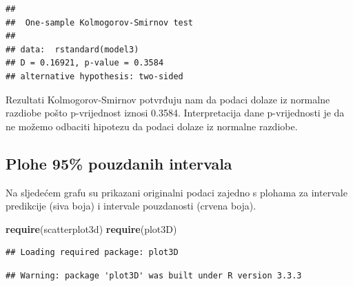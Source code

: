 \documentclass[]{article}
\newenvironment{Shaded}{\begin{snugshade}}{\end{snugshade}}
\newcommand{\KeywordTok}[1]{\textcolor[rgb]{0.13,0.29,0.53}{\textbf{{#1}}}}
\newcommand{\NormalTok}[1]{{#1}}
\begin{document}
\begin{verbatim}
## 
##  One-sample Kolmogorov-Smirnov test
## 
## data:  rstandard(model3)
## D = 0.16921, p-value = 0.3584
## alternative hypothesis: two-sided
\end{verbatim}

Rezultati Kolmogorov-Smirnov potvrđuju nam da podaci dolaze iz normalne
razdiobe pošto p-vrijednost iznosi 0.3584. Interpretacija dane
p-vrijednosti je da ne možemo odbaciti hipotezu da podaci dolaze iz
normalne razdiobe.

\subsection{Plohe 95\% pouzdanih
intervala}\label{plohe-95-pouzdanih-intervala}

Na sljedećem grafu su prikazani originalni podaci zajedno s plohama za
intervale predikcije (siva boja) i intervale pouzdanosti (crvena boja).

\begin{Shaded}
\begin{Highlighting}[]
\KeywordTok{require}\NormalTok{(scatterplot3d)}
\KeywordTok{require}\NormalTok{(plot3D)}
\end{Highlighting}
\end{Shaded}

\begin{verbatim}
## Loading required package: plot3D
\end{verbatim}

\begin{verbatim}
## Warning: package 'plot3D' was built under R version 3.3.3
\end{verbatim}
\end{document}
